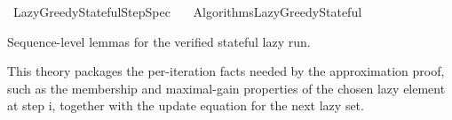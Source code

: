 %
\begin{isabellebody}%
%
%
\isadelimtheory
%
\endisadelimtheory
%
\isatagtheory
{}\isamarkupfalse%
\ Lazy{\isacharunderscore}{\kern0pt}Greedy{\isacharunderscore}{\kern0pt}Stateful{\isacharunderscore}{\kern0pt}StepSpec\isanewline
\ \ \ {\isachardoublequoteopen}{\isachardot}{\kern0pt}{\isachardot}{\kern0pt}{\isacharslash}{\kern0pt}Algorithms{\isacharslash}{\kern0pt}Lazy{\isacharunderscore}{\kern0pt}Greedy{\isacharunderscore}{\kern0pt}Stateful{\isachardoublequoteclose}\isanewline
{}%
\endisatagtheory
{\isafoldtheory}%
%
\isadelimtheory
%
\endisadelimtheory
%
\begin{isamarkuptext}%
Sequence-level lemmas for the verified stateful lazy run.

  This theory packages the per-iteration facts needed by the approximation
  proof, such as the membership and maximal-gain properties of the chosen
  lazy element at step i, together with the update equation for the next lazy set.


\end{isamarkuptext}
\end{isabellebody}
